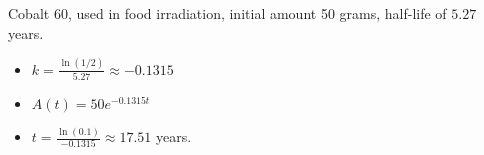 {Cobalt 60, used in food irradiation, initial amount 50 grams, half-life of $5.27$ years.  \label{radioactivefirst}}
{\begin{itemize}  \item $k = \frac{\ln(1/2)}{5.27} \approx -0.1315$

\item $A(t) = 50e^{-0.1315t}$

\item  $t = \frac{\ln(0.1)}{-0.1315} \approx 17.51$ years.

\end{itemize}}